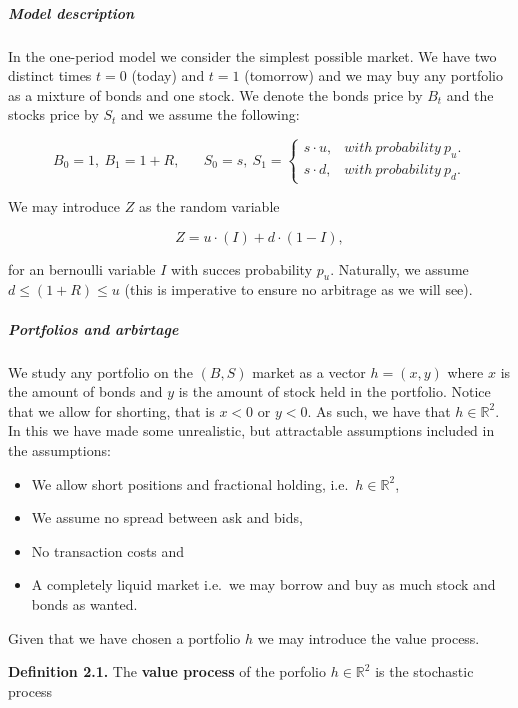 \documentclass[
]{article}
\providecommand{\tightlist}{%
  \setlength{\itemsep}{0pt}\setlength{\parskip}{0pt}}
\begin{document}
\hypertarget{model-description}{%
\subparagraph{Model description}\label{model-description}}

In the one-period model we consider the simplest possible market. We
have two distinct times \(t=0\) (today) and \(t=1\) (tomorrow) and we
may buy any portfolio as a mixture of bonds and one stock. We denote the
bonds price by \(B_t\) and the stocks price by \(S_t\) and we assume the
following:

\[
B_0=1,\ B_1=1+R,\hspace{20pt}S_0=s,\ S_1=\left\{\begin{matrix}s\cdot u, & with\ probability\ p_u.\\s\cdot d, & with\ probability\ p_d.\end{matrix}\right.
\]

We may introduce \(Z\) as the random variable

\[
Z=u\cdot (I)+d\cdot (1-I),
\]

for an bernoulli variable \(I\) with succes probability \(p_u\).
Naturally, we assume \(d\le (1+R)\le u\) (this is imperative to ensure
no arbitrage as we will see).

\hypertarget{portfolios-and-arbirtage}{%
\subparagraph{Portfolios and arbirtage}\label{portfolios-and-arbirtage}}

We study any portfolio on the \((B,S)\) market as a vector \(h=(x,y)\)
where \(x\) is the amount of bonds and \(y\) is the amount of stock held
in the portfolio. Notice that we allow for shorting, that is \(x<0\) or
\(y<0\). As such, we have that \(h\in \mathbb{R}^2\). In this we have
made some unrealistic, but attractable assumptions included in the
assumptions:

\begin{itemize}
\tightlist
\item
  We allow short positions and fractional holding,
  i.e.~\(h\in \mathbb{R}^2\),
\item
  We assume no spread between ask and bids,
\item
  No transaction costs and
\item
  A completely liquid market i.e.~we may borrow and buy as much stock
  and bonds as wanted.
\end{itemize}

Given that we have chosen a portfolio \(h\) we may introduce the value
process.

\textbf{Definition 2.1.} The \textbf{value process} of the porfolio
\(h\in\mathbb{R}^2\) is the stochastic process
\end{document}
